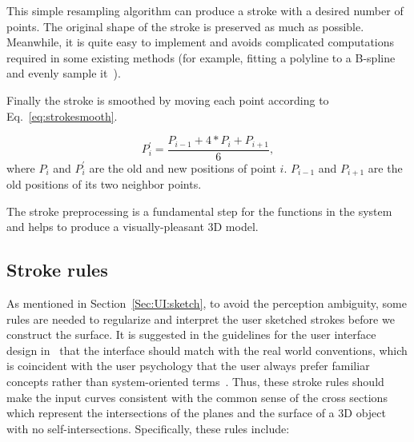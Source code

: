 This simple resampling algorithm can produce a stroke with a desired
number of points. The original shape of the stroke is preserved as
much as possible. Meanwhile, it is quite easy to implement and
avoids complicated computations required in some existing methods
(for example, fitting a polyline to a B-spline and evenly sample
it~\cite{CMZHB99}).

Finally the stroke is smoothed by moving each point according to Eq.~\ref{eq:strokesmooth}.

\begin{equation}
\label{eq:strokesmooth}
    P_i^\prime = \frac{P_{i-1}+4*P_i+P_{i+1}}{6},
\end{equation}
where $P_i$ and $P_i^\prime$ are the old and new positions of point
$i$. $P_{i-1}$ and $P_{i+1}$ are the old positions of its two
neighbor points.

The stroke preprocessing is a fundamental step for the functions in
the system and helps to produce a visually-pleasant 3D model.


\subsection{Stroke rules}
\label{ch3:sec:algo:rule}

As mentioned in Section~\ref{Sec:UI:sketch}, to avoid the
perception ambiguity, some rules are needed to regularize and
interpret the user sketched strokes before we construct the surface.
It is suggested in the guidelines for the user interface design
in~\cite{MN90} that the interface should match with the real world
conventions, which is coincident with the user psychology that the
user always prefer familiar concepts rather than system-oriented
terms~\cite{GC87,DA06}. Thus, these stroke rules should make the
input curves consistent with the common sense of the cross sections
which represent the intersections of the planes and the surface
of a 3D object with no self-intersections. Specifically, these
rules include:

